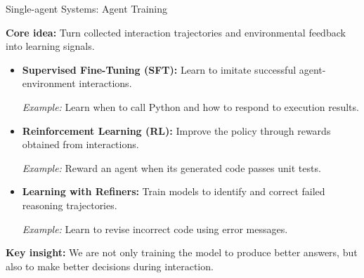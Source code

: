 \documentclass[aspectratio=169]{beamer}
\begin{document}
\begin{frame}{Single-agent Systems: Agent Training}

\textbf{Core idea:} Turn collected interaction trajectories and environmental feedback into learning signals.

\vspace{0.3cm}

\begin{itemize}
    \item \textbf{Supervised Fine-Tuning (SFT):}
    Learn to imitate successful agent-environment interactions.

    \textit{Example:} Learn when to call Python and how to respond to execution results.

    \vspace{0.25cm}

    \item \textbf{Reinforcement Learning (RL):}
    Improve the policy through rewards obtained from interactions.

    \textit{Example:} Reward an agent when its generated code passes unit tests.

    \vspace{0.25cm}

    \item \textbf{Learning with Refiners:}
    Train models to identify and correct failed reasoning trajectories.

    \textit{Example:} Learn to revise incorrect code using error messages.
\end{itemize}

\vspace{0.3cm}

\textbf{Key insight:} We are not only training the model to produce better answers, but also to make better decisions during interaction.

\end{frame}
\end{document}
